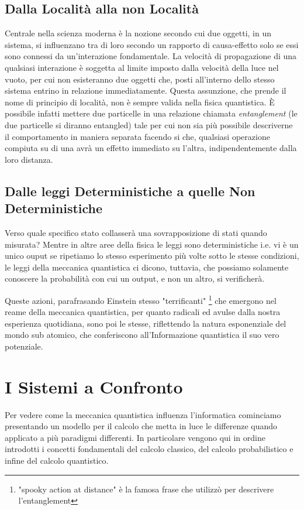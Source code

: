 \documentclass[12pt,a4paper,openright]{report}
\begin{document}
\subsection{Dalla Località alla non Località}
Centrale nella scienza moderna è la nozione secondo cui due oggetti, in un sistema, si influenzano tra di loro secondo un rapporto di causa-effetto solo se essi
sono connessi da un'interazione fondamentale. La velocità di propagazione di una qualsiasi interazione è soggetta al limite imposto dalla velocità della luce 
nel vuoto, per cui non esisteranno due oggetti che, posti all'interno dello stesso sistema entrino in relazione immediatamente. Questa assunzione, 
che prende il nome di principio di località, non è sempre valida nella fisica quantistica. È possibile infatti
mettere due particelle in una relazione chiamata \emph{entanglement} (le due particelle si diranno entangled) tale per cui non sia più possibile
descriverne il comportamento in maniera separata facendo si che, qualsiasi  operazione compiuta su di una avrà un effetto immediato su l'altra, 
indipendentemente dalla loro distanza.    

\subsection{Dalle leggi Deterministiche a quelle Non Deterministiche}
Verso quale specifico stato collasserà una sovrapposizione di stati quando misurata? Mentre in altre aree della fisica le leggi sono deterministiche 
i.e. vi è un unico ouput se ripetiamo lo stesso esperimento più volte sotto le stesse condizioni, le leggi della meccanica quantistica
ci dicono, tuttavia, che possiamo solamente conoscere la probabilità con cui un output, e non un altro, si verificherà. \par

Queste azioni, parafrasando Einstein stesso "terrificanti" \footnote{"spooky action at distance" è la famosa frase che utilizzò per descrivere l'entanglement} che emergono nel reame della meccanica quantistica, per quanto radicali ed avulse
dalla nostra esperienza quotidiana, sono poi le stesse, riflettendo la natura esponenziale del mondo sub atomico, che conferiscono all'Informazione quantistica il suo vero potenziale. 

\section{I Sistemi a Confronto}
Per vedere come la meccanica quantistica influenza l'informatica cominciamo presentando un modello per il calcolo che metta in luce 
le differenze quando applicato a più paradigmi differenti. In particolare vengono qui in ordine introdotti i concetti fondamentali 
del calcolo classico, del calcolo probabilistico e infine del calcolo quantistico.
\end{document}
